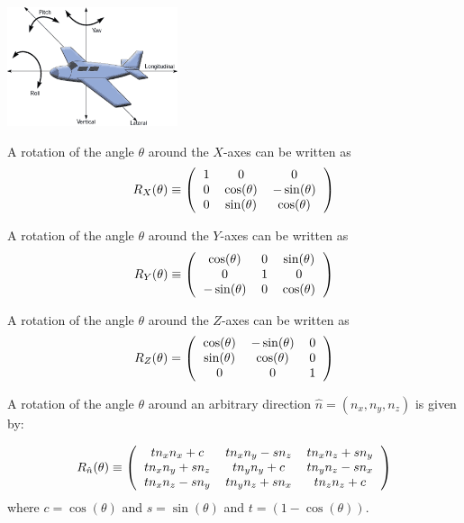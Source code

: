 \documentclass[12pt]{article}
\begin{document}
\begin{center}
\includegraphics[width=5cm]{images/plane.png}
\end{center}

A rotation of the angle $\theta$ around the $X$-axes can be written as
\begin{equation}
R_X(\theta) \equiv \left(\begin{tabular}{ccc}
1 & 0 & 0 \\
0 & $\cos(\theta)$ & $-\sin(\theta)$  \\
0 & $\sin(\theta)$ & $\cos(\theta) $ 
\end{tabular}\right)
\end{equation}

A rotation of the angle $\theta$ around the $Y$-axes can be written as
\begin{equation}
R_Y(\theta) \equiv \left(\begin{tabular}{ccc}
$\cos(\theta)$ & 0 & $\sin(\theta)$ \\
0 & 1 & 0 \\
$-\sin(\theta)$ & 0 & $\cos(\theta)$ 
\end{tabular}\right)
\end{equation}

A rotation of the angle $\theta$ around the $Z$-axes can be written as
\begin{equation}
R_Z(\theta) = \left(\begin{tabular}{ccc}
$\cos(\theta)$ & $-\sin(\theta)$ & 0 \\
$\sin(\theta)$ & $\cos(\theta)$ & 0 \\
0 & 0 & 1
\end{tabular}\right)
\end{equation}

A rotation of the angle $\theta$ around an arbitrary direction $\hat n = (n_x,n_y,n_z)$ is given by:

\begin{equation}
R_{\hat n}(\theta) \equiv \left(\begin{tabular}{ccc} 
$t n_x n_x+c$ & $t n_x n_y-s n_z$ & $t n_x n_z+s n_y$ \\
$t n_x n_y+s n_z$ & $t n_y n_y+c$ & $t n_y n_z-s n_x$ \\
$t n_x n_z-s n_y$ & $t n_y n_z+s n_x$ & $t n_z n_z+c$
\end{tabular}\right)
\end{equation}
where $c=\cos(\theta)$ and $s=\sin(\theta)$ and $t=(1-\cos(\theta))$.
\end{document}
